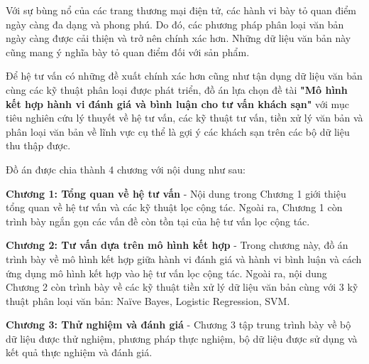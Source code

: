 Với sự bùng nổ của các trang thương mại điện tử, các hành vi bày tỏ quan điểm ngày
càng đa dạng và phong phú. Do đó, các phương pháp phân loại văn bản ngày càng được
cải thiện và trở nên chính xác hơn. Những dữ liệu văn bản này cũng mang ý nghĩa bày
tỏ quan điểm đối với sản phẩm.

Để hệ tư vấn có những đề xuất chính xác hơn cũng như tận dụng dữ liệu văn bản
cùng các kỹ thuật phân loại được phát triển, đồ án lựa chọn đề tài \textbf{"Mô hình kết hợp
hành vi đánh giá và bình luận cho tư vấn khách sạn"} với mục tiêu nghiên cứu lý thuyết về hệ tư vấn, các kỹ thuật tư vấn, tiền xử lý văn bản và phân loại văn bản về lĩnh
vực cụ thể là gợi ý các khách sạn trên các bộ dữ liệu thu thập được.

Đồ án được chia thành 4 chương với nội dung như sau:

\textbf{Chương 1: Tổng quan về hệ tư vấn} - Nội dung trong Chương 1 giới thiệu tổng quan về hệ tư vấn và các kỹ thuật lọc cộng
tác. Ngoài ra, Chương 1 còn trình bày ngắn gọn các vấn đề còn tồn tại của hệ tư vấn lọc
cộng tác.

\textbf{Chương 2: Tư vấn dựa trên mô hình kết hợp} - Trong chương này, đồ án trình bày về mô hình kết hợp giữa hành vi đánh giá và hành
vi bình luận và cách ứng dụng mô hình kết hợp vào hệ tư vấn lọc cộng tác. Ngoài ra, nội
dung Chương 2 còn trình bày về các kỹ thuật tiền xử lý dữ liệu văn bản cùng với 3 kỹ
thuật phân loại văn bản: Naïve Bayes, Logistic Regression, SVM.

\textbf{Chương 3: Thử nghiệm và đánh giá} - Chương 3 tập trung trình bày về bộ dữ liệu được thử nghiệm, phương pháp thực
nghiệm, bộ dữ liệu được sử dụng và kết quả thực nghiệm và đánh giá.
